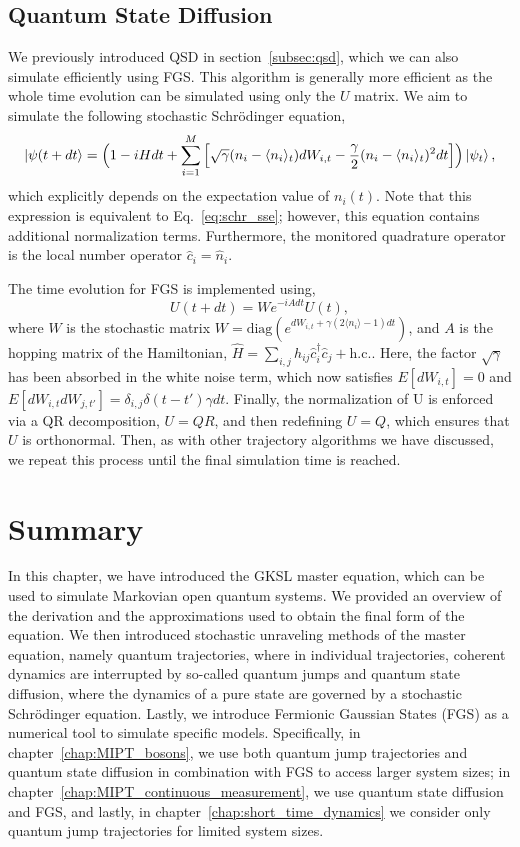 \subsection{Quantum State Diffusion}

We previously introduced QSD in section~\ref{subsec:qsd}, which we can also simulate efficiently using FGS. This algorithm is generally more efficient as the whole time evolution can be simulated using only the $U$ matrix. We aim to simulate the following stochastic Schr\"{o}dinger equation,
\begin{equation}
\label{eq:SSE}
       \ket{\psi(t+dt} = \Big(1-iH dt + \sum\limits_{i=1}^M\Big[ \sqrt{\gamma} (n_i-\langle n_i\rangle_t) dW_{i,t}- \frac{\gamma}{2} (n_i-\langle n_i\rangle_t)^2 dt\Big]  \Big) \ket{\psi_t},
\end{equation}
which explicitly depends on the expectation value of $n_i(t)$. Note that this expression is equivalent to Eq.~\ref{eq:schr_sse}; however, this equation contains additional normalization terms. Furthermore, the monitored quadrature operator is the local number operator $\hat{c}_i = \hat{n}_i$.  

The time evolution for FGS is implemented using,
\begin{equation}
\label{eq:evol}
U(t+dt) = W e^{-iAdt} U(t),
\end{equation}
where  $W$ is the stochastic matrix $W = \text{diag}(e^{dW_{i,t}+\gamma(2\langle n_i \rangle-1)dt})$, and $A$ is the hopping matrix of the Hamiltonian, $\hat{H} = \sum\limits_{i,j} h_{ij} \hat{c}_i^\dagger \hat{c}_j  + \text{h.c.}$. Here, the factor $\sqrt{\gamma}$ has been absorbed in the white noise term, which now satisfies $E[dW_{i,t}] = 0$ and $E[dW_{i,t}dW_{j,t'}] = \delta_{i,j}\delta(t-t') \gamma dt$. Finally, the normalization of U is enforced via a QR decomposition, $U = QR$, and then redefining $U = Q$, which ensures that $U$ is orthonormal. Then, as with other trajectory algorithms we have discussed, we repeat this process until the final simulation time is reached. 

\section{Summary}

In this chapter, we have introduced the GKSL master equation, which can be used to simulate Markovian open quantum systems. We provided an overview of the derivation and the approximations used to obtain the final form of the equation. We then introduced stochastic unraveling methods of the master equation, namely quantum trajectories, where in individual trajectories, coherent dynamics are interrupted by so-called quantum jumps and quantum state diffusion, where the dynamics of a pure state are governed by a stochastic Schr\"{o}dinger equation. Lastly, we introduce Fermionic Gaussian States (FGS) as a numerical tool to simulate specific models. Specifically, in chapter~\ref{chap:MIPT_bosons}, we use both quantum jump trajectories and quantum state diffusion in combination with FGS to access larger system sizes; in chapter~\ref{chap:MIPT_continuous_measurement}, we use quantum state diffusion and FGS, and lastly, in chapter~\ref{chap:short_time_dynamics} we consider only quantum jump trajectories for limited system sizes.